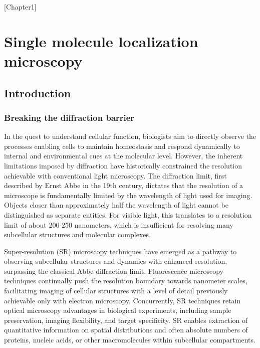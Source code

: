 [Chapter1]

\chapter{Single molecule localization microscopy}

\section{Introduction}

\subsection{Breaking the diffraction barrier}

In the quest to understand cellular function, biologists aim to directly observe the processes enabling cells to maintain homeostasis and respond dynamically to internal and environmental cues at the molecular level. However, the inherent limitations imposed by diffraction have historically constrained the resolution achievable with conventional light microscopy. The diffraction limit, first described by Ernst Abbe in the 19th century, dictates that the resolution of a microscope is fundamentally limited by the wavelength of light used for imaging. Objects closer than approximately half the wavelength of light cannot be distinguished as separate entities. For visible light, this translates to a resolution limit of about 200-250 nanometers, which is insufficient for resolving many subcellular structures and molecular complexes.

Super-resolution (SR) microscopy techniques have emerged as a pathway to observing subcellular structures and dynamics with enhanced resolution, surpassing the classical Abbe diffraction limit. Fluorescence microscopy techniques continually push the resolution boundary towards nanometer scales, facilitating imaging of cellular structures with a level of detail previously achievable only with electron microscopy. Concurrently, SR techniques retain optical microscopy advantages in biological experiments, including sample preservation, imaging flexibility, and target specificity. SR enables extraction of quantitative information on spatial distributions and often absolute numbers of proteins, nucleic acids, or other macromolecules within subcellular compartments.

